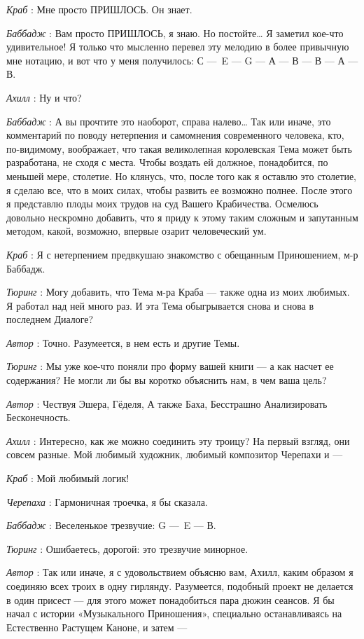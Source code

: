 \emph{Краб} : Мне просто ПРИШЛОСЬ. Он знает.

\emph{Баббадж} : Вам просто ПРИШЛОСЬ, я знаю. Но постойте\ldots{} Я заметил кое-что удивительное! Я только что мысленно перевел эту мелодию в более привычную мне нотацию, и вот что у меня получилось: С ---~E --- G --- А --- В --- В --- А --- В.

\emph{Ахилл} : Ну и что?

\emph{Баббадж} : А вы прочтите это наоборот, справа налево\ldots{} Так или иначе, это комментарий по поводу нетерпения и самомнения современного человека, кто, по-видимому, воображает, что такая великолепная королевская Тема может быть разработана, не сходя с места. Чтобы воздать ей должное, понадобится, по меньшей мере, столетие. Но клянусь, что, после того как я оставлю это столетие, я сделаю все, что в моих силах, чтобы развить ее возможно полнее. После этого я представлю плоды моих трудов на суд Вашего Крабичества. Осмелюсь довольно нескромно добавить, что я приду к этому таким сложным и запутанным методом, какой, возможно, впервые озарит человеческий ум.

\emph{Краб} : Я с нетерпением предвкушаю знакомство с обещанным Приношением, м-р Баббадж.

\emph{Тюринг} : Могу добавить, что Тема м-ра Краба --- также одна из моих любимых. Я работал над ней много раз. И эта Тема обыгрывается снова и снова в последнем Диалоге?

\emph{Автор} : Точно. Разумеется, в нем есть и другие Темы.

\emph{Тюринг} : Мы уже кое-что поняли про форму вашей книги --- а как насчет ее содержания? Не могли ли бы вы коротко объяснить нам, в чем ваша цель?

\emph{Автор} : Чествуя Эшера, Гёделя, А также Баха, Бесстрашно Анализировать Бесконечность.

\emph{Ахилл} : Интересно, как же можно соединить эту троицу? На первый взгляд, они совсем разные. Мой любимый художник, любимый композитор Черепахи и ---

\emph{Краб} : Мой любимый логик!

\emph{Черепаха} : Гармоничная троечка, я бы сказала.

\emph{Баббадж} : Веселенькое трезвучие: G ---~E --- В.

\emph{Тюринг} : Ошибаетесь, дорогой: это трезвучие минорное.

\emph{Автор} : Так или иначе, я с удовольствием объясню вам, Ахилл, каким образом я соединяю всех троих в одну гирлянду. Разумеется, подобный проект не делается в один присест --- для этого может понадобиться пара дюжин сеансов. Я бы начал с истории «Музыкального Приношения», специально останавливаясь на Естественно Растущем Каноне, и затем ---

